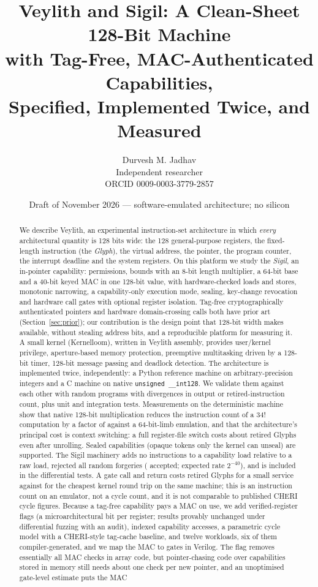 \documentclass[10pt,a4paper]{article}
\title{Veylith and Sigil: A Clean-Sheet 128-Bit Machine\\with Tag-Free, MAC-Authenticated Capabilities,\\Specified, Implemented Twice, and Measured}
\author{Durvesh M. Jadhav\\Independent researcher\\ORCID 0009-0003-3779-2857}
\date{Draft of November 2026 --- software-emulated architecture; no silicon}
\begin{document}
\maketitle
\begin{abstract}
We describe Veylith, an experimental instruction-set architecture in which \emph{every} architectural quantity is 128 bits wide: the 128 general-purpose registers, the fixed-length instruction (the \emph{Glyph}), the virtual address, the pointer, the program counter, the interrupt deadline and the system registers. On this platform we study the \emph{Sigil}, an in-pointer capability: permissions, bounds with an 8-bit length multiplier, a 64-bit base and a 40-bit keyed MAC in one 128-bit value, with hardware-checked loads and stores, monotonic narrowing, a capability-only execution mode, sealing, key-change revocation and hardware call gates with optional register isolation. Tag-free cryptographically authenticated pointers and hardware domain-crossing calls both have prior art (Section~\ref{sec:prior}); our contribution is the design point that 128-bit width makes available, without stealing address bits, and a reproducible platform for measuring it. A small kernel (Kernelloom), written in Veylith assembly, provides user/kernel privilege, aperture-based memory protection, preemptive multitasking driven by a 128-bit timer, 128-bit message passing and deadlock detection. The architecture is implemented twice, independently: a Python reference machine on arbitrary-precision integers and a C machine on native \texttt{unsigned \_\_int128}. We validate them against each other with \FuzzPrograms{} random programs with \FuzzDivergences{} divergences in output or retired-instruction count, plus \UnitTests{} unit and integration tests. Measurements on the deterministic machine show that native 128-bit multiplication reduces the instruction count of a 34! computation by a factor of \FactRatio{} against a 64-bit-limb emulation, and that the architecture's principal cost is context switching: a full register-file switch costs about \YieldCost{} retired Glyphs even after unrolling. Sealed capabilities (opaque tokens only the kernel can unseal) are supported. The Sigil machinery adds no instructions to a capability load relative to a raw load, rejected all \SigilGuesses{} random forgeries (\SigilAccepted{} accepted; expected rate $2^{-40}$), and is included in the differential tests. A gate call and return costs \GateCall{} retired Glyphs for a small service against \SyscallCost{} for the cheapest kernel round trip on the same machine; this is an instruction count on an emulator, not a cycle count, and it is not comparable to published CHERI cycle figures. Because a tag-free capability pays a MAC on use, we add verified-register flags (a microarchitectural bit per register; results provably unchanged under differential fuzzing with an audit), indexed capability accesses, a parametric cycle model with a CHERI-style tag-cache baseline, and twelve workloads, six of them compiler-generated, and we map the MAC to gates in Verilog. The flag removes essentially all MAC checks in array code, but pointer-chasing code over capabilities stored in memory still needs about one check per new pointer, and an unoptimised gate-level estimate puts the MAC 
\end{abstract}
\end{document}
